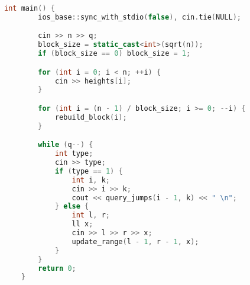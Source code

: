 \documentclass[12pt]{article}
\begin{document}
\begin{itemize}
{\begin{lstlisting}[language=C++, basicstyle=\ttfamily\fontsize{7pt}{8pt}\selectfont]
    int main() {
        ios_base::sync_with_stdio(false), cin.tie(NULL);

        cin >> n >> q;
        block_size = static_cast<int>(sqrt(n));
        if (block_size == 0) block_size = 1;

        for (int i = 0; i < n; ++i) {
            cin >> heights[i];
        }

        for (int i = (n - 1) / block_size; i >= 0; --i) {
            rebuild_block(i);
        }

        while (q--) {
            int type;
            cin >> type;
            if (type == 1) {
                int i, k;
                cin >> i >> k;
                cout << query_jumps(i - 1, k) << " \n";
            } else {
                int l, r;
                ll x;
                cin >> l >> r >> x;
                update_range(l - 1, r - 1, x);
            }
        }
        return 0;
    }
    \end{lstlisting}
}
\end{itemize}
\end{document}
